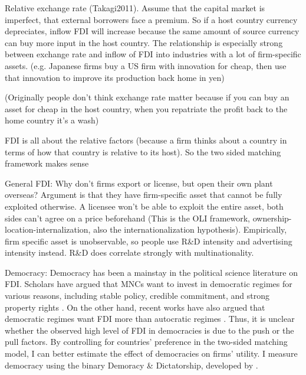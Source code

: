 
Relative exchange rate (Takagi2011). Assume that the capital market is
imperfect, that external borrowers face a premium. So if a host country currency
depreciates, inflow FDI will increase because the same amount of source currency
can buy more input in the host country. The relationship is especially strong
between exchange rate and inflow of FDI into industries with a lot of
firm-specific assets. (e.g. Japanese firms buy a US firm with innovation for
cheap, then use that innovation to improve its production back home in yen)

(Originally people don't think exchange rate matter because if you can buy an
asset for cheap in the host country, when you repatriate the profit back to the
home country it's a wash)

FDI is all about the relative factors (because a firm thinks about a country in
terms of how that country is relative to its host). So the two sided matching
framework makes sense

General FDI: Why don't firms export or license, but open their own plant
overseas? Argument is that they have firm-specific asset that cannot be fully
exploited otherwise. A licensee won't be able to exploit the entire asset, both
sides can't agree on a price beforehand (This is the OLI framework,
ownership-location-internalization, also the internationalization hypothesis).
Empirically, firm specific asset is unobservable, so people use R\&D intensity
and advertising intensity instead. R\&D does correlate strongly with
multinationality.
  
\item Democracy: Democracy has been a mainstay in the political science
  literature on FDI. Scholars have argued that MNCs want to invest in democratic
  regimes for various reasons, including stable policy, credible commitment, and
  strong property rights \citep{Ahlquist2006, Li2003, Jensen2003}. On the other
  hand, recent works have also argued that democratic regimes want FDI more than
  autocratic regimes \citep{Pandya2016}. Thus, it is unclear whether the
  observed high level of FDI in democracies is due to the push or the pull
  factors. By controlling for countries' preference in the two-sided matching
  model, I can better estimate the effect of democracies on firms' utility. I
  measure democracy using the binary Demoracy \& Dictatorship, developed by
  \citet{Cheibub2009b}.